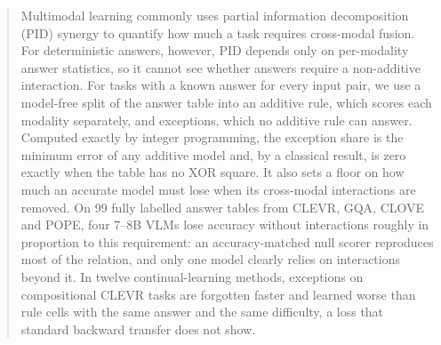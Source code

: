 \begin{abstract}
Multimodal learning commonly uses partial information decomposition (PID) synergy to quantify how much a task requires
cross-modal fusion. For deterministic answers, however, PID depends only on per-modality answer statistics, so it
cannot see whether answers require a non-additive interaction. For tasks with a known answer for every input pair, we
use a model-free split of the answer table into an additive rule, which scores each modality separately, and
exceptions, which no additive rule can answer. Computed exactly by integer programming, the exception share is the
minimum error of any additive model and, by a classical result, is zero exactly when the table has no XOR square. It
also sets a floor on how much an accurate model must lose when its cross-modal interactions are removed. On 99 fully
labelled answer tables from CLEVR, GQA, CLOVE and POPE, four 7--8B VLMs lose accuracy without interactions roughly in
proportion to this requirement: an accuracy-matched null scorer reproduces most of the relation, and only one model
clearly relies on interactions beyond it. In twelve continual-learning methods, exceptions on compositional CLEVR tasks
are forgotten faster and learned worse than rule cells with the same answer and the same difficulty, a loss that
standard backward transfer does not show.
\end{abstract}
